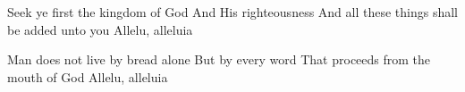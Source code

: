 \endverse                         %


\beginverse                       %
\chordsoff  								%

Seek ye first the kingdom of God
And His righteousness
And all these things shall be added unto you
Allelu, alleluia

\endverse                         %

\beginverse                       %
\chordsoff  								%

Man does not live by bread alone
But by every word
That proceeds from the mouth of God
Allelu, alleluia

\endverse                         %



\endsong                          %
%